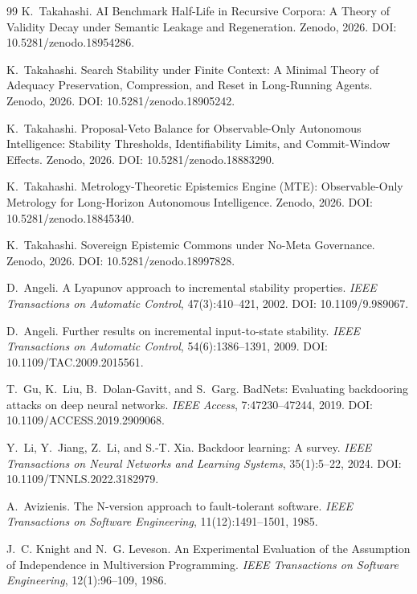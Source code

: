 \documentclass[11pt]{article}
\theoremstyle{definition}
\newcommand{\1}{\mathbf{1}}
\begin{document}
\begin{thebibliography}{99}
K.~Takahashi.
\newblock AI Benchmark Half-Life in Recursive Corpora: A Theory of Validity Decay under Semantic Leakage and Regeneration.
\newblock Zenodo, 2026. DOI: 10.5281/zenodo.18954286.

K.~Takahashi.
\newblock Search Stability under Finite Context: A Minimal Theory of Adequacy Preservation, Compression, and Reset in Long-Running Agents.
\newblock Zenodo, 2026. DOI: 10.5281/zenodo.18905242.

K.~Takahashi.
\newblock Proposal-Veto Balance for Observable-Only Autonomous Intelligence: Stability Thresholds, Identifiability Limits, and Commit-Window Effects.
\newblock Zenodo, 2026. DOI: 10.5281/zenodo.18883290.

K.~Takahashi.
\newblock Metrology-Theoretic Epistemics Engine (MTE): Observable-Only Metrology for Long-Horizon Autonomous Intelligence.
\newblock Zenodo, 2026. DOI: 10.5281/zenodo.18845340.


K.~Takahashi.
\newblock Sovereign Epistemic Commons under No-Meta Governance.
\newblock Zenodo, 2026. DOI: 10.5281/zenodo.18997828.

D.~Angeli.
\newblock A Lyapunov approach to incremental stability properties.
\newblock \emph{IEEE Transactions on Automatic Control}, 47(3):410--421, 2002. DOI: 10.1109/9.989067.

D.~Angeli.
\newblock Further results on incremental input-to-state stability.
\newblock \emph{IEEE Transactions on Automatic Control}, 54(6):1386--1391, 2009. DOI: 10.1109/TAC.2009.2015561.

T.~Gu, K.~Liu, B.~Dolan-Gavitt, and S.~Garg.
\newblock BadNets: Evaluating backdooring attacks on deep neural networks.
\newblock \emph{IEEE Access}, 7:47230--47244, 2019. DOI: 10.1109/ACCESS.2019.2909068.

Y.~Li, Y.~Jiang, Z.~Li, and S.-T. Xia.
\newblock Backdoor learning: A survey.
\newblock \emph{IEEE Transactions on Neural Networks and Learning Systems}, 35(1):5--22, 2024. DOI: 10.1109/TNNLS.2022.3182979.

A.~Avizienis.
\newblock The N-version approach to fault-tolerant software.
\newblock \emph{IEEE Transactions on Software Engineering}, 11(12):1491--1501, 1985.

J.~C. Knight and N.~G. Leveson.
\newblock An Experimental Evaluation of the Assumption of Independence in Multiversion Programming.
\newblock \emph{IEEE Transactions on Software Engineering}, 12(1):96--109, 1986.


\end{thebibliography}
\end{document}
